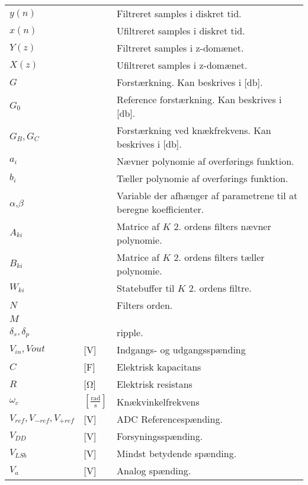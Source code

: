 \begin{table}[h!]
\begin{threeparttable}
\begin{tabular}{l l l}
$y(n)$\tnote{*}	    &		            & Filtreret samples i diskret tid.	\\
$x(n)$\tnote{*}	    &		            & Ufiltreret samples i diskret tid.	\\
$Y(z)$\tnote{*}	    &		            & Filtreret samples i z-domænet.	\\
$X(z)$\tnote{*}	    &		            & Ufiltreret samples i  z-domænet.	\\
$G$\tnote{*}		&   				& Forstærkning. Kan beskrives i [\si{\decibel}].\\
$G_0$\tnote{*}		&   				& Reference forstærkning. Kan beskrives i [\si{\decibel}].\\
$G_B,G_C$\tnote{*}	&   				& Forstærkning ved knækfrekvens. Kan beskrives i [\si{\decibel}].\\
$a_i$\tnote{*}	    &   				& Nævner polynomie af overførings funktion.\\
$b_i$\tnote{*}	    &   				& Tæller polynomie af overførings funktion.\\
$\alpha$\tnote{*},$\beta$\tnote{*}	    &   			& Variable der afhænger af parametrene til at beregne koefficienter.\\
$A_{ki}$\tnote{*}	    &   			& Matrice af $K$ 2. ordens filters nævner polynomie.\\
$B_{ki}$\tnote{*}	    &   			& Matrice af $K$ 2. ordens filters tæller polynomie.\\
$W_{ki}$\tnote{*}	    &   			& Statebuffer til $K$ 2. ordens filtre.\\
$N$\tnote{*}        &                   & Filters orden.\\
$M$\tnote{*}        &                   & \\   
$\delta_s, \delta_p$\tnote{*}	&   				& ripple.\\
$V_{in},V{out}$ & [\si{\volt}] & Indgangs- og udgangsspænding\\
$C$ & [\si{\farad}] & Elektrisk kapacitans \\
$R$ & [\si{\ohm}] & Elektrisk resistans \\
$\omega _c$ & $[\frac{\si{\radian}}{\si{\second}}]$ & Knækvinkelfrekvens \\
$V_{ref},V_{-ref},V_{+ref}$ & [\si{\volt}] & ADC Referencespænding. \\
$V_{DD}$ & [\si{\volt}] & Forsyningsspænding. \\
$V_{LSb}$ & [\si{\volt}] & Mindst betydende spænding. \\
$V_a$ &[\si{\volt}] & Analog spænding. \\

\end{tabular}
\end{threeparttable}
\end{table}
